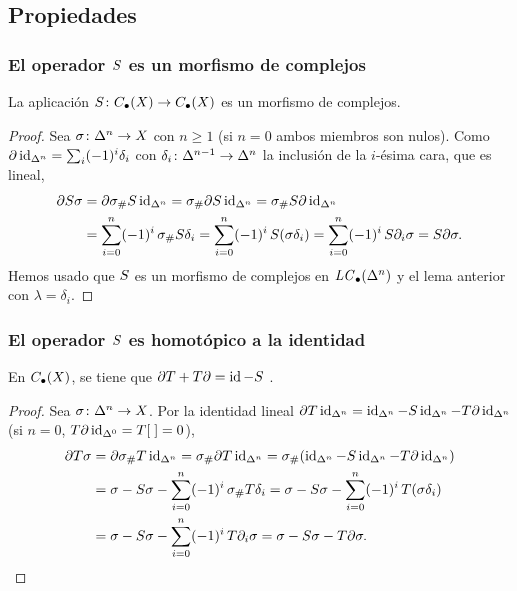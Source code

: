 \subsection{Propiedades}

\begin{frame}
  \frametitle{El operador $S$ es un morfismo de complejos}

  \begin{proposition}
    La aplicación $S\colon C_\bullet(X)\to C_\bullet(X)$ es un morfismo de complejos.
  \end{proposition}

  \begin{proof}
    Sea $\sigma\colon\Delta^{n}\to X$ con $n\geq1$ (si $n=0$ ambos miembros
    son nulos). Como $\partial\operatorname{id}_{\Delta^{n}}=\sum_i(-1)^i\delta_i$ con $\delta_i\colon\Delta^{n-1}\to\Delta^{n}$ la inclusión de la $i$-ésima cara, que es
    lineal,
    \begin{align*}
      \partial S\sigma
      &=\partial\sigma_\#S\operatorname{id}_{\Delta^{n}}
      =\sigma_\#\partial S\operatorname{id}_{\Delta^{n}}
      =\sigma_\#S\partial\operatorname{id}_{\Delta^{n}}\\
      &=\sum_{i=0}^n(-1)^i\,\sigma_\#S\delta_i
      =\sum_{i=0}^n(-1)^i\,S(\sigma\delta_i)
      =\sum_{i=0}^n(-1)^i\,S\partial_i\sigma
      =S\partial\sigma.
    \end{align*}
    Hemos usado que $S$ es un morfismo de complejos en $\mathit{LC}_\bullet(\Delta^{n})$ y
    el lema anterior con $\lambda=\delta_i$.
  \end{proof}
\end{frame}

\begin{frame}
  \frametitle{El operador $S$ es homotópico a la identidad}

  \begin{proposition}
    En $C_\bullet(X)$, se tiene que $\partial T+T\partial=\operatorname{id}-S$ .
  \end{proposition}

  \begin{proof}
    Sea $\sigma\colon\Delta^{n}\to X$. Por la identidad lineal
    $\partial T\operatorname{id}_{\Delta^{n}}=\operatorname{id}_{\Delta^{n}}-S\operatorname{id}_{\Delta^{n}}-T\partial\operatorname{id}_{\Delta^{n}}$ (si $n=0$,
    $T\partial\operatorname{id}_{\Delta^{0}}=T[\;]=0$),
    \begin{align*}
      \partial T\sigma
      &=\partial \sigma_\#T\operatorname{id}_{\Delta^{n}}
      =\sigma_\#\partial T\operatorname{id}_{\Delta^{n}}
      =\sigma_\#(\operatorname{id}_{\Delta^{n}}-S\operatorname{id}_{\Delta^{n}}-T\partial\operatorname{id}_{\Delta^{n}})\\
      &=\sigma-S\sigma-\sum_{i=0}^n(-1)^i\,\sigma_\#T\delta_i
      =\sigma-S\sigma-\sum_{i=0}^n(-1)^i\,T(\sigma\delta_i)\\
      &=\sigma-S\sigma-\sum_{i=0}^n(-1)^i\,T\partial_i\sigma
      =\sigma-S\sigma-T\partial\sigma.
    \end{align*}
  \end{proof}
\end{frame}

